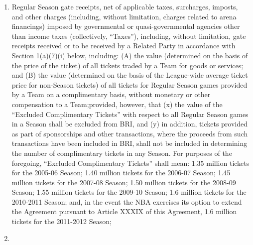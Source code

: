 \documentclass[
]{book}
\providecommand{\tightlist}{%
  \setlength{\itemsep}{0pt}\setlength{\parskip}{0pt}}
\begin{document}
\begin{enumerate}
\begin{enumerate}
    \begin{enumerate}
    \def\labelenumiii{(\roman{enumiii})}
    \tightlist
    \item
      Regular Season gate receipts, net of applicable taxes, surcharges, imposts, and other charges (including, without limitation, charges related to arena financings) imposed by governmental or quasi-governmental agencies other than income taxes (collectively, ``Taxes''), including, without limitation, gate receipts received or to be received by a Related Party in accordance with Section 1(a)(7)(i) below, including: (A) the value (determined on the basis of the price of the ticket) of all tickets traded by a Team for goods or services; and (B) the value (determined on the basis of the League-wide average ticket price for non-Season tickets) of all tickets for Regular Season games provided by a Team on a complimentary basis, without monetary or other compensation to a Team;provided, however, that (x) the value of the ``Excluded Complimentary Tickets'' with respect to all Regular Season games in a Season shall be excluded from BRI, and (y) in addition, tickets provided as part of sponsorships and other transactions, where the proceeds from such transactions have been included in BRI, shall not be included in determining the number of complimentary tickets in any Season. For purposes of the foregoing, ``Excluded Complimentary Tickets'' shall mean: 1.35 million tickets for the 2005-06 Season; 1.40 million tickets for the 2006-07 Season; 1.45 million tickets for the 2007-08 Season; 1.50 million tickets for the 2008-09 Season; 1.55 million tickets for the 2009-10 Season; 1.6 million tickets for the 2010-2011 Season; and, in the event the NBA exercises its option to extend the Agreement pursuant to Article XXXIX of this Agreement, 1.6 million tickets for the 2011-2012 Season;
    \item

\end{enumerate}
\end{enumerate}
\end{enumerate}
\end{document}
